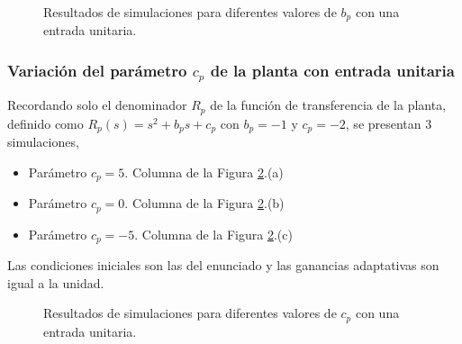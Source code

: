 \documentclass[letterpaper,11pt]{article} %
\begin{document}
\begin{figure}[h]
	\centering
	\captionsetup{justification=centering}
	\newline
	\noindent
	\newline
	\noindent
	\addtocounter{figure}{-1}  
	\caption{Resultados de simulaciones para diferentes valores de $b_p$ con una entrada unitaria.}
	\label{parametrob}
\end{figure}
\subsubsection{Variación del parámetro $c_p$ de la planta con entrada unitaria}
Recordando solo el denominador $R_p$ de la función de transferencia de la planta, definido como $R_p(s) = s^2 + b_ps + c_p$ con $b_p=-1$ y $c_p = -2$, se presentan 3 simulaciones,
\begin{itemize}
	\item Parámetro $c_p = 5$. Columna de la Figura \ref{parametroc}.(a)
	\item Parámetro $c_p = 0$. Columna de la Figura \ref{parametroc}.(b)
	\item Parámetro $c_p = -5$. Columna de la Figura \ref{parametroc}.(c)
\end{itemize}
Las condiciones iniciales son las del enunciado y las ganancias adaptativas son igual a la unidad.
\newpage
\begin{figure}[h]
	\centering
	\captionsetup{justification=centering}
	\newline
	\noindent
	\newline
	\noindent
	\addtocounter{figure}{-1}  
	\caption{Resultados de simulaciones para diferentes valores de $c_p$ con una entrada unitaria.}
	\label{parametroc}
\end{figure}
\end{document}
